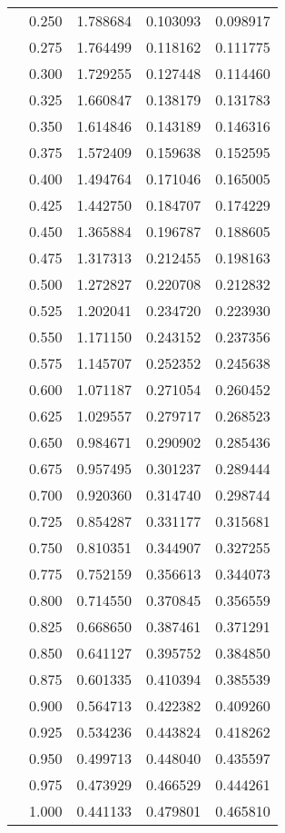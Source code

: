 \begin{tabular}{llrrr}
         & 0.250 &   1.788684 &   0.103093 &   0.098917 \\
         & 0.275 &   1.764499 &   0.118162 &   0.111775 \\
         & 0.300 &   1.729255 &   0.127448 &   0.114460 \\
         & 0.325 &   1.660847 &   0.138179 &   0.131783 \\
         & 0.350 &   1.614846 &   0.143189 &   0.146316 \\
         & 0.375 &   1.572409 &   0.159638 &   0.152595 \\
         & 0.400 &   1.494764 &   0.171046 &   0.165005 \\
         & 0.425 &   1.442750 &   0.184707 &   0.174229 \\
         & 0.450 &   1.365884 &   0.196787 &   0.188605 \\
         & 0.475 &   1.317313 &   0.212455 &   0.198163 \\
         & 0.500 &   1.272827 &   0.220708 &   0.212832 \\
         & 0.525 &   1.202041 &   0.234720 &   0.223930 \\
         & 0.550 &   1.171150 &   0.243152 &   0.237356 \\
         & 0.575 &   1.145707 &   0.252352 &   0.245638 \\
         & 0.600 &   1.071187 &   0.271054 &   0.260452 \\
         & 0.625 &   1.029557 &   0.279717 &   0.268523 \\
         & 0.650 &   0.984671 &   0.290902 &   0.285436 \\
         & 0.675 &   0.957495 &   0.301237 &   0.289444 \\
         & 0.700 &   0.920360 &   0.314740 &   0.298744 \\
         & 0.725 &   0.854287 &   0.331177 &   0.315681 \\
         & 0.750 &   0.810351 &   0.344907 &   0.327255 \\
         & 0.775 &   0.752159 &   0.356613 &   0.344073 \\
         & 0.800 &   0.714550 &   0.370845 &   0.356559 \\
         & 0.825 &   0.668650 &   0.387461 &   0.371291 \\
         & 0.850 &   0.641127 &   0.395752 &   0.384850 \\
         & 0.875 &   0.601335 &   0.410394 &   0.385539 \\
         & 0.900 &   0.564713 &   0.422382 &   0.409260 \\
         & 0.925 &   0.534236 &   0.443824 &   0.418262 \\
         & 0.950 &   0.499713 &   0.448040 &   0.435597 \\
         & 0.975 &   0.473929 &   0.466529 &   0.444261 \\
         & 1.000 &   0.441133 &   0.479801 &   0.465810 \\
\bottomrule
\end{tabular}
